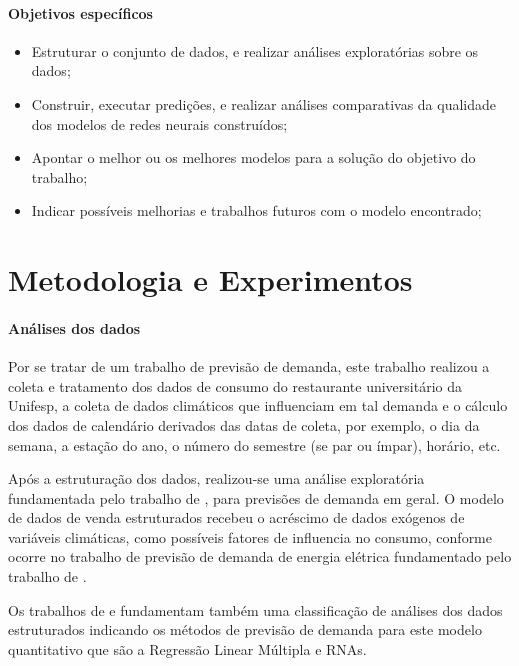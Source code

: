 \documentclass[	12pt, Times, openright, twoside, a4paper, english, brazil]{abntex2}
\begin{document}
        \paragraph{Objetivos específicos}
          \begin{itemize}
          \item Estruturar o conjunto de dados, e realizar análises exploratórias sobre os dados; 
          \item Construir, executar predições, e realizar análises comparativas da qualidade dos modelos de redes neurais construídos;
          \item Apontar o melhor ou os melhores modelos para a solução do objetivo do trabalho;
          \item Indicar possíveis melhorias e trabalhos futuros com o modelo encontrado;
          \end{itemize}
           
      \section{Metodologia e Experimentos}
        \paragraph{Análises dos dados}

          Por se tratar de um trabalho de previsão de demanda,  este trabalho realizou a coleta e tratamento dos dados de consumo do restaurante universitário da Unifesp, a coleta de dados climáticos que influenciam em tal demanda e o cálculo dos dados de calendário derivados das datas de coleta, por exemplo, o dia da semana, a estação do ano, o número do semestre (se par ou ímpar), horário, etc.

          Após a estruturação dos dados, realizou-se uma análise exploratória fundamentada pelo trabalho de \cite{Junior2007}, para previsões de demanda em geral.
          O modelo de dados de venda estruturados recebeu o acréscimo de dados exógenos de variáveis climáticas, como possíveis fatores de influencia no consumo, conforme ocorre no trabalho de previsão de demanda de energia elétrica fundamentado pelo trabalho de \cite{Almeida2013,RUAS2012,Silva2010}.

          Os trabalhos de \cite{Junior2007} e \cite{Silva2010} fundamentam também uma classificação de análises dos dados estruturados indicando os métodos de previsão de demanda para este modelo quantitativo que são a Regressão Linear Múltipla e RNAs.
\end{document}
